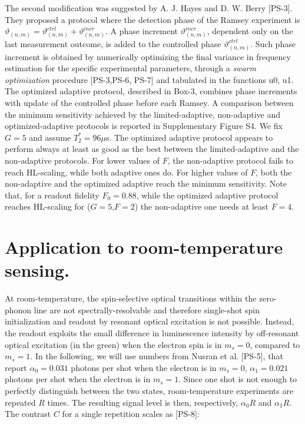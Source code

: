 \documentclass{report}
\begin{document}
The second modification was suggested by A. J. Hayes and D. W. Berry [PS-3]. They proposed a protocol where the detection phase of the Ramsey experiment is $\vartheta_{(n,m)} = \vartheta_{(n,m)}^{ctrl} + \vartheta_{(n,m)}^{incr}$. A phase increment $\vartheta_{(n,m)}^{incr}$, dependent only on the last measurement outcome, is added to the controlled phase $\vartheta_{(n,m)}^{ctrl}$. Such phase increment is obtained by numerically optimizing the final variance in frequency estimation for the specific experimental parameters, through a \textit{swarm optimization} procedure [PS-3,PS-6, PS-7] and tabulated in the functions u0, u1. \\

The optimized adaptive protocol, described in Box-3, combines phase increments with update of the controlled phase before each Ramsey. A comparison between the minimum sensitivity achieved by the limited-adaptive, non-adaptive and optimized-adaptive protocols is reported in Supplementary Figure S4. We fix $G=5$ and assume $T_2^* = 96 \mu$s. 
The optimized adaptive protocol appears to perform always at least as good as the best between the limited-adaptive and the non-adaptive protocols. For lower values of $F$, the non-adaptive protocol fails to reach HL-scaling, while both adaptive ones do. For higher values of $F$, both the non-adaptive and the optimized adaptive reach the minimum sensitivity. Note that, for a readout fidelity $F_0 = 0.88$, while the optimized adaptive protocol reaches HL-scaling for ($G = 5$,$F = 2$) the non-adaptive one needs at least $F = 4$.

\section{Application to room-temperature sensing.}
At room-temperature, the spin-selective optical transitions within the zero-phonon line are not spectrally-resolvable and therefore single-shot spin initialization and readout by resonant optical excitation is not possible. Instead, the readout exploits the small difference in luminescence intensity by off-resonant optical excitation (in the green) when the electron spin is in $m_s = 0$, compared to $m_s = 1$. In the following, we will use numbers from Nusran et al. [PS-5], that report $\alpha_0 = 0.031$ photons per shot when the electron is in $m_s = 0$, $\alpha_1 = 0.021$ photons per shot when the electron is in $m_s = 1$.  Since one shot is not enough to perfectly distinguish between the two states, room-temperature experiments are repeated $R$ times. The resulting signal level is then, respectively, $\alpha_0 R$ and $\alpha_1 R$. The contrast $C$ for a single repetition scales as [PS-8]:
\end{document}
